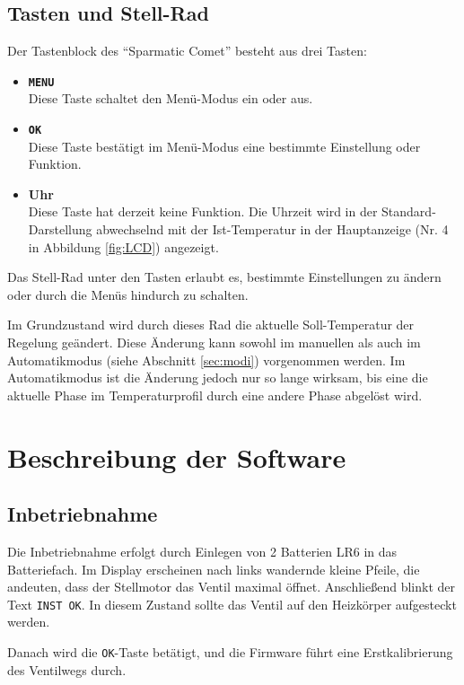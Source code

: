 \documentclass[a5paper,twoside]{article}
\newcommand\SC{"`Sparmatic Comet"'}
\begin{document}
\subsection {
  Tasten und Stell-Rad
}

Der Tastenblock des \SC{} besteht aus drei Tasten:

\begin{itemize}
\item \textbf{\texttt{MENU}}\\ Diese Taste schaltet den Menü-Modus ein oder aus.
\item \textbf{\texttt{OK}}\\ Diese Taste bestätigt im Menü-Modus eine bestimmte
  Einstellung oder Funktion.
\item \textbf{Uhr}\\ Diese Taste hat derzeit keine Funktion.  Die Uhrzeit wird
  in der Standard-Darstellung abwechselnd mit der Ist-Temperatur in der
  Hauptanzeige (Nr. 4 in Abbildung \ref{fig:LCD}) angezeigt.
\end{itemize}

Das Stell-Rad unter den Tasten erlaubt es, bestimmte Einstellungen zu
ändern oder durch die Menüs hindurch zu schalten.

Im Grundzustand wird durch dieses Rad die aktuelle Soll-Temperatur
der Regelung geändert.  Diese Änderung kann sowohl im manuellen als
auch im Automatikmodus (siehe Abschnitt \ref{sec:modi}) vorgenommen
werden.  Im Automatikmodus ist die Änderung jedoch nur so lange
wirksam, bis eine die aktuelle Phase im Temperaturprofil durch eine
andere Phase abgelöst wird.

\section {
  Beschreibung der Software
}

\subsection {
  Inbetriebnahme
}

Die Inbetriebnahme erfolgt durch Einlegen von 2 Batterien LR6 in das
Batteriefach.  Im Display erscheinen nach links wandernde kleine
Pfeile, die andeuten, dass der Stellmotor das Ventil maximal öffnet.
Anschließend blinkt der Text \texttt{INST OK}.  In diesem Zustand sollte
das Ventil auf den Heizkörper aufgesteckt werden.

Danach wird die \texttt{OK}-Taste betätigt, und die Firmware führt eine
Erstkalibrierung des Ventilwegs durch.
\end{document}
